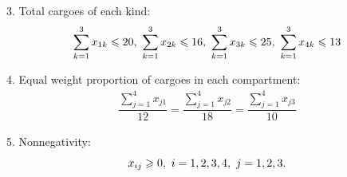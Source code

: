 \documentclass[a4paper]{article}
\begin{document}
\begin{enumerate}
\begin{enumerate}
\begin{enumerate}
		3. Total cargoes of each kind:
		\begin{equation*}		
			\sum_{k=1}^{3}x_{1k}\ls 20,\ 
			\sum_{k=1}^{3}x_{2k}\ls 16,\ 
			\sum_{k=1}^{3}x_{3k}\ls 25,\ 
			\sum_{k=1}^{3}x_{4k}\ls 13			
		\end{equation*}
		
		4. Equal weight proportion of cargoes in each compartment:
		\begin{equation*}
		\begin{aligned}
		\dfrac{\sum_{j=1}^{4}x_{j1}}{12}
		=\dfrac{\sum_{j=1}^{4}x_{j2}}{18}
		=\dfrac{\sum_{j=1}^{4}x_{j3}}{10}
		\end{aligned}
		\end{equation*}
		
		5. Nonnegativity:
		\begin{equation*}
		x_{ij}\gs 0,\ i=1,2,3,4,\ j=1,2,3.
		\end{equation*}
	\end{enumerate}
	
\end{enumerate}

\end{enumerate}

%  

%  
  
\end{document}
